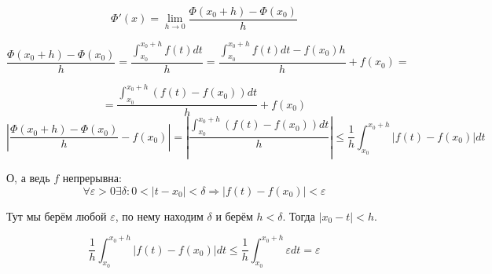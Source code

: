 \documentclass[a4paper]{article}
\begin{document}
\begin{definit}
\begin{hproof}
\[
\Phi'(x) = \lim_{h \rightarrow 0} \frac{\Phi(x_0 + h) - \Phi(x_0)}{h}
\]

\[
 \frac{\Phi(x_0 + h) - \Phi(x_0)}{h} = \frac{\int_{x_0}^{x_0+h} f(t)dt}{h} = \frac{\int_{x_0}^{x_0+h} f(t)dt - f(x_0)h}{h} + f(x_0) = 
\]

\[
 = \frac{\int_{x_0}^{x_0+h} (f(t) - f(x_0))dt}{h} + f(x_0)
\]
\[
\left|  \frac{\Phi(x_0 + h) - \Phi(x_0)}{h} - f(x_0) \right| = \left| \frac{\int_{x_0}^{x_0+h} (f(t) - f(x_0))dt}{h} \right| \leq \frac{1}{h} \int_{x_0}^{x_0+h} |f(t) - f(x_0)|dt
\]

О, а ведь $f$ непрерывна: 
\[
\forall \varepsilon > 0 \exists \delta: 0<|t-x_0|<\delta \Rightarrow |f(t) - f(x_0)| < \varepsilon
\]

Тут мы берём любой $\varepsilon$, по нему находим $\delta$ и берём $h < \delta$. Тогда $|x_0-t| < h$.


\[
\frac{1}{h} \int_{x_0}^{x_0+h} |f(t) - f(x_0)|dt \leq \frac{1}{h} \int_{x_0}^{x_0+h} \varepsilon dt = \varepsilon
\]
\end{hproof}


\end{definit}
\end{document}
